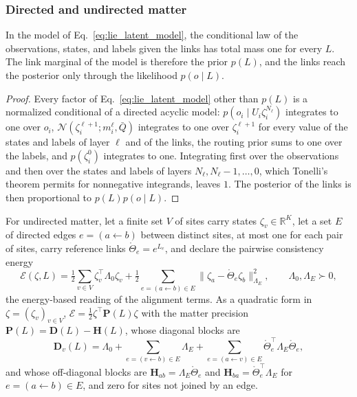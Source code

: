 \documentclass[twoside,11pt]{article}
\begin{document}
\subsubsection{Directed and undirected matter}

\begin{proposition}
\label{prop:app_directed}
In the model of Eq.~\eqref{eq:lie_latent_model}, the conditional law of the observations, states, and labels given the links has total mass one for every $L$. The link marginal of the model is therefore the prior $p(L)$, and the links reach the posterior only through the likelihood $p(o\mid L)$.
\end{proposition}
\begin{proof}
Every factor of Eq.~\eqref{eq:lie_latent_model} other than $p(L)$ is a normalized conditional of a directed acyclic model: $p(o_i\mid U_i\zeta_i^{N_\ell})$ integrates to one over $o_i$, $\mathcal N(\zeta_i^{\ell+1};m_i^\ell,\bar Q)$ integrates to one over $\zeta_i^{\ell+1}$ for every value of the states and labels of layer $\ell$ and of the links, the routing prior sums to one over the labels, and $p(\zeta_i^0)$ integrates to one. Integrating first over the observations and then over the states and labels of layers $N_\ell,N_\ell-1,\ldots,0$, which Tonelli's theorem permits for nonnegative integrands, leaves $1$. The posterior of the links is then proportional to $p(L)p(o\mid L)$.
\end{proof}

For undirected matter, let a finite set $V$ of sites carry states $\zeta_v\in\mathbb R^K$, let a set $E$ of directed edges $e=(a\leftarrow b)$ between distinct sites, at most one for each pair of sites, carry reference links $\mathring\Theta_e=e^{L_e}$, and declare the pairwise consistency energy
\begin{equation}
\mathcal E(\zeta,L)=\tfrac12\sum_{v\in V}\zeta_v^\top\Lambda_0\zeta_v+\tfrac12\sum_{e=(a\leftarrow b)\in E}\bigl\|\zeta_a-\mathring\Theta_e\zeta_b\bigr\|_{\Lambda_E}^2,\qquad\Lambda_0,\Lambda_E\succ0,
\label{eq:app_undirected_energy}
\end{equation}
the energy-based reading of the alignment terms. As a quadratic form in $\zeta=(\zeta_v)_{v\in V}$, $\mathcal E=\tfrac12\zeta^\top\mathbf P(L)\zeta$ with the matter precision $\mathbf P(L)=\mathbf D(L)-\mathbf H(L)$, whose diagonal blocks are
\begin{equation}
\mathbf D_v(L)=\Lambda_0+\sum_{e=(v\leftarrow b)\in E}\Lambda_E+\sum_{e=(a\leftarrow v)\in E}\mathring\Theta_e^\top\Lambda_E\mathring\Theta_e,
\label{eq:app_matter_diagonal}
\end{equation}
and whose off-diagonal blocks are $\mathbf H_{ab}=\Lambda_E\mathring\Theta_e$ and $\mathbf H_{ba}=\mathring\Theta_e^\top\Lambda_E$ for $e=(a\leftarrow b)\in E$, and zero for sites not joined by an edge.
\end{document}
